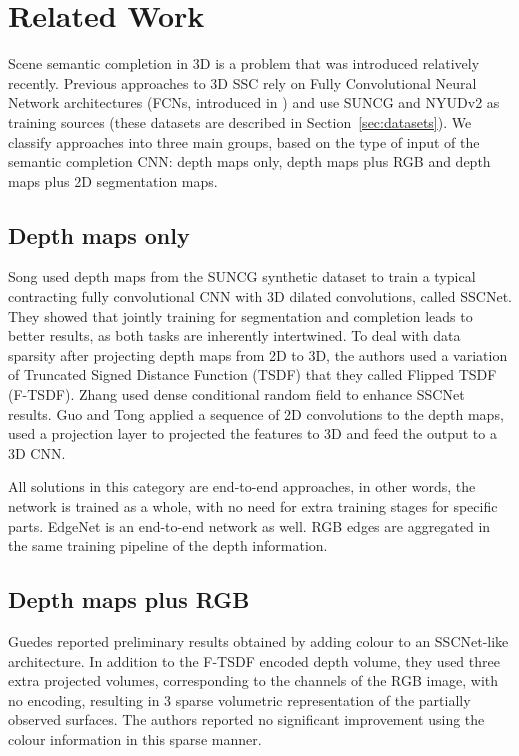 \section{Related Work}

Scene semantic completion in 3D is a problem that was introduced relatively recently.
Previous approaches to 3D SSC rely on Fully Convolutional Neural Network architectures (FCNs, introduced in \cite{FCNN}) and use SUNCG and NYUDv2 as training sources (these datasets are described in Section~\ref{sec:datasets}).
We classify approaches into three main groups, based on the type of input of the semantic completion CNN: depth maps only, depth maps plus RGB and depth maps plus 2D segmentation maps.


\subsection{Depth maps only} 
 Song \etal\cite{song_semantic_2017} used depth maps from the SUNCG synthetic dataset to train a typical contracting fully convolutional CNN with 3D dilated convolutions, called SSCNet. They showed that jointly training for segmentation and completion leads to better results, as both tasks are inherently intertwined. To deal with data sparsity after projecting depth maps from 2D to 3D, the authors used a variation of Truncated Signed Distance Function (TSDF) that they called Flipped TSDF (F-TSDF). 
Zhang \etal\cite{zhang_semantic_2018} used dense conditional random field to enhance SSCNet results. 
 Guo and Tong \cite{guo_view-volume_2018} applied a sequence of 2D convolutions to the depth maps, used a projection layer to projected the features to 3D and feed the output to a 3D CNN. 
 
 All solutions in this category are end-to-end approaches, in other words, the network is trained as a whole, with no need for extra training stages for specific parts. EdgeNet is an end-to-end network as well. RGB edges are aggregated in the same training pipeline of the depth information. 

\subsection{Depth maps plus RGB} 

Guedes \etal\cite{guedes_semantic_2018} reported preliminary results obtained by adding colour to an SSCNet-like architecture. In addition to the F-TSDF encoded depth volume, they used three extra projected volumes, corresponding to the channels of the RGB image, with no encoding, resulting in 3 sparse volumetric representation of the partially observed surfaces. The authors reported no significant improvement using the colour information in this sparse manner.

